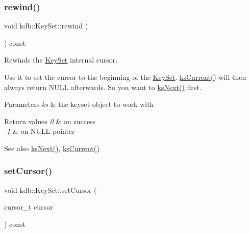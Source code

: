 \subsubsection{\texorpdfstring{rewind()}{rewind()}}
{\footnotesize\ttfamily void kdb\+::\+Key\+Set\+::rewind (\begin{DoxyParamCaption}{ }\end{DoxyParamCaption}) const\hspace{0.3cm}{\ttfamily [inline]}}



Rewinds the \mbox{\hyperlink{classkdb_1_1KeySet}{Key\+Set}} internal cursor. 

Use it to set the cursor to the beginning of the \mbox{\hyperlink{classkdb_1_1KeySet}{Key\+Set}}. \mbox{\hyperlink{group__keyset_ga4287b9416912c5f2ab9c195cb74fb094}{ks\+Current()}} will then always return N\+U\+LL afterwards. So you want to \mbox{\hyperlink{group__keyset_ga317321c9065b5a4b3e33fe1c399bcec9}{ks\+Next()}} first.


\begin{DoxyCode}{0}
\end{DoxyCode}



\begin{DoxyParams}{Parameters}
{\em ks} & the keyset object to work with \\
\hline
\end{DoxyParams}

\begin{DoxyRetVals}{Return values}
{\em 0} & on success \\
\hline
{\em -\/1} & on N\+U\+LL pointer \\
\hline
\end{DoxyRetVals}
\begin{DoxySeeAlso}{See also}
\mbox{\hyperlink{group__keyset_ga317321c9065b5a4b3e33fe1c399bcec9}{ks\+Next()}}, \mbox{\hyperlink{group__keyset_ga4287b9416912c5f2ab9c195cb74fb094}{ks\+Current()}} 
\end{DoxySeeAlso}
\mbox{\label{classkdb_1_1KeySet_a716d522e1f64e53d4f9706b5d71bb1b5}} 
\subsubsection{\texorpdfstring{setCursor()}{setCursor()}}
{\footnotesize\ttfamily void kdb\+::\+Key\+Set\+::set\+Cursor (\begin{DoxyParamCaption}\item[{cursor\+\_\+t}]{cursor }\end{DoxyParamCaption}) const\hspace{0.3cm}{\ttfamily [inline]}}



